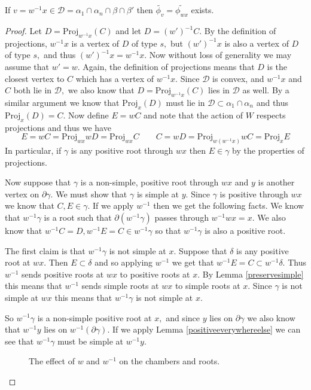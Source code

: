 \documentclass[class=book, crop=false,12 pt]{standalone}
\begin{document}
\begin{lemma}
	If $v=w^{-1}x\in \mathcal{D}=\alpha_1\cap \alpha_n\cap \beta \cap \beta'$ then $\tilde{\phi_v}=\tilde{\phi_{wx}}$ exists.
	\label{Dexists}
\end{lemma}
\begin{proof}
	Let $D=\mathrm{Proj}_{w^{-1}x}(C)$ and let $D=(w')^{-1}C.$ By the definition of projections, $w^{-1}x$ is a vertex of $D$ of type $s,$ but $(w')^{-1}x$ is also a vertex of $D$ of type $s,$ and thus $(w')^{-1}x=w^{-1}x.$ Now without loss of generality we may assume that $w'=w.$ Again, the definition of projections means that $D$ is the closest vertex to $C$ which has a vertex of $w^{-1}x.$ Since $\mathcal{D}$ is convex, and $w^{-1}x$ and $C$ both lie in $\mathcal{D},$ we also know that $D=\mathrm{Proj}_{w^{-1}x}(C)$ lies in $\mathcal{D}$ as well. By a similar argument we know that $\mathrm{Proj}_{x}(D)$ must lie in $\mathcal{D}\subset \alpha_1\cap \alpha_n$ and thus $\mathrm{Proj}_{x}(D)=C.$ Now define $E=wC$ and note that the action of $W$ respects projections and thus we have
	\[
		E=wC=\mathrm{Proj}_{wx}{wD}=\mathrm{Proj}_{wx}{C} \qquad C=wD=\mathrm{Proj}_{w(w^{-1}x)}{wC}=\mathrm{Proj}_{x}{E}
	\]
In particular, if $\gamma$ is any positive root through $wx$ then $E\in \gamma$ by the properties of projections.



Now suppose that $\gamma$ is a non-simple, positive root through $wx$ and $y$ is another vertex on $\partial \gamma.$ We must show that $\gamma$ is simple at $y.$ Since $\gamma$ is positive through $wx$ we know that $C,E\in \gamma.$ If we apply $w^{-1}$ then we get the following facts. We know that $w^{-1}\gamma$ is a root such that $\partial (w^{-1}\gamma)$ passes through $w^{-1}wx=x.$ We also know that $w^{-1}C=D,w^{-1}E=C\in w^{-1}\gamma$ so that $w^{-1}\gamma$ is also a positive root.

The first claim is that $w^{-1}\gamma$ is not simple at $x.$ Suppose that $\delta$ is any positive root at $wx.$ Then $E\subset \delta$ and so applying $w^{-1}$ we get that $w^{-1}E=C\subset w^{-1}\delta.$ Thus $w^{-1}$ sends positive roots at $wx$ to positive roots at $x.$ By Lemma \ref{preservesimple} this means that $w^{-1}$ sends simple roots at $wx$ to simple roots at $x.$ Since $\gamma$ is not simple at $wx$ this means that $w^{-1}\gamma$ is not simple at $x.$

So $w^{-1}\gamma$ is a non-simple positive root at $x,$ and since $y$ lies on $\partial \gamma$ we also know that $w^{-1}y$ lies on $w^{-1}(\partial \gamma).$ If we apply Lemma \ref{positiveeverywhereelse} we can see that $w^{-1}\gamma$ must be simple at $w^{-1}y.$ 
\begin{figure}[h]
	\label{mappicture}
\caption{The effect of $w$ and $w^{-1}$ on the chambers and roots.}
\end{figure}



\end{proof}
\end{document}
